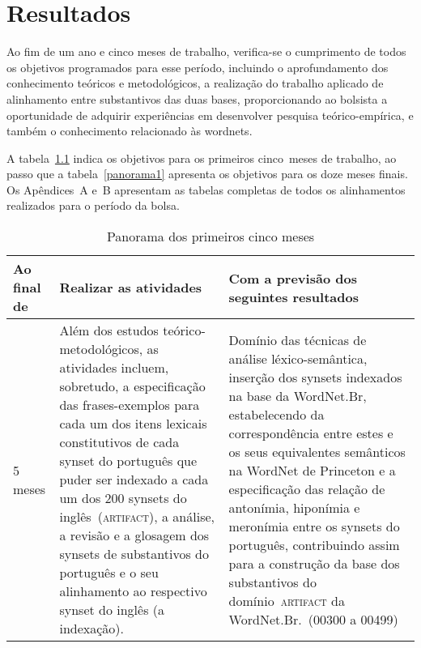 \chapter{Resultados}


Ao fim de um ano e cinco meses de trabalho, verifica-se o cumprimento de todos
os objetivos programados para esse período, incluindo o aprofundamento dos
conhecimento teóricos e metodológicos, a realização do trabalho aplicado de
alinhamento entre substantivos das duas bases, proporcionando ao bolsista a
oportunidade de adquirir experiências em desenvolver pesquisa teórico-empírica,
e também o conhecimento relacionado às wordnets.
\enlargethispage{\baselineskip}

A tabela~\ref{panorama0} indica os objetivos para os primeiros cinco~meses de
trabalho, ao passo que a tabela~\ref{panorama1} apresenta os objetivos para os
doze meses finais. Os Apêndices~A e~B apresentam as tabelas completas de todos
os alinhamentos realizados para o período da bolsa.

\begin{table}[!h]\footnotesize
  \centering
  \begin{tabularx}{\linewidth}{ l X X } 
    \toprule
    \textbf{Ao final de} & \textbf{Realizar as atividades} & \textbf{Com a previsão dos seguintes resultados} \\
    \midrule
    5 meses & Além dos estudos teórico-metodológicos, as atividades incluem,
sobretudo, a especificação das frases-exemplos para cada um dos itens lexicais
constitutivos de cada synset do português que puder ser indexado a cada um dos
200 synsets do inglês~(\textsc{artifact}), a análise, a revisão e a glosagem
dos synsets de substantivos do português e o seu alinhamento ao respectivo
synset do inglês (a indexação). & Domínio das técnicas de análise
léxico-semântica, inserção dos synsets indexados na base da WordNet.Br,
estabelecendo da correspondência entre estes e os seus equivalentes semânticos
na WordNet de Princeton e a especificação das relação de antonímia, hiponímia e
meronímia entre os synsets do português, contribuindo assim para a construção
da base dos substantivos do domínio~\textsc{artifact} da WordNet.Br.~(00300 a
00499) \\
    \bottomrule
  \end{tabularx}
  \caption{Panorama dos primeiros cinco meses}
  \label{panorama0}
\end{table}

